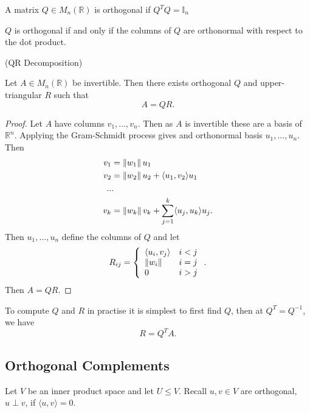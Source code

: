 \begin{definition}
  A matrix $Q \in M_n(\mathbb{R})$ is orthogonal if $Q^T Q = \mathbb{I}_n$
\end{definition}

\begin{remark}
    $Q$ is orthogonal if and only if the columns of $Q$ are orthonormal with respect to the dot product.
\end{remark}

\begin{theorem} (QR Decomposition)
  
  Let $A \in M_{n}(\mathbb{R})$ be invertible. Then there exists orthogonal $Q$ and upper-triangular $R$ such that
  \[A = QR.\]
\end{theorem}
\begin{proof}
    Let $A$ have columns $v_1,...,v_n$. Then as $A$ is invertible these are a basis of $\mathbb{R}^n$. Applying the Gram-Schmidt process gives and orthonormal basis $u_1,...,u_n$. Then
    \begin{align*}
      v_1 &= \left\lVert w_1 \right\rVert u_1 \\
      v_2 &= \left\lVert w_2 \right\rVert u_2 + \langle u_1, v_2 \rangle u_1 \\
      ..&. \\
      v_k &= \left\lVert w_k \right\rVert v_k + \sum_{ j = 1}^{k} \langle u_j, u_k \rangle u_j
    .\end{align*}
    Then $u_1,...,u_n$ define the columns of $Q$ and let 
    \[R_{ij} = \left\{\begin{array}{lr}
    \langle u_i, v_j \rangle & i < j\\
    \left\lVert w_i \right\rVert & i = j\\
    0 & i > j\\
    \end{array} \right..\]
    Then $A = QR$.
\end{proof}

\begin{remark}
  To compute $Q$ and $R$ in practise it is simplest to first find $Q$, then at $Q^T = Q^{-1}$, we have 
  \[R = Q^T A.\]
\end{remark}

\subsection{Orthogonal Complements}

Let $V$ be an inner product space and let $U \leq V$. Recall $u, v \in V$ are orthogonal, $u \perp v$, if $\langle u, v \rangle = 0$.

